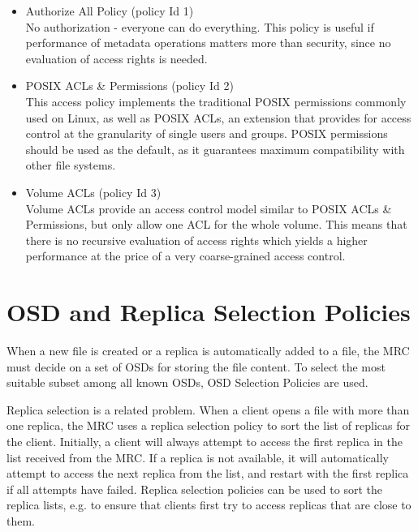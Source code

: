 \documentclass[a4paper,10pt]{book}
\begin{document}
\begin{itemize}
 \item Authorize All Policy (policy Id 1)\\
No authorization - everyone can do everything. This policy is useful if performance of metadata operations matters more than security, since no evaluation of access rights is needed.

 \item POSIX ACLs \& Permissions (policy Id 2)\\
This access policy implements the traditional POSIX permissions commonly used on Linux, as well as POSIX ACLs, an extension that provides for access control at the granularity of single users and groups. POSIX permissions should be used as the default, as it guarantees maximum compatibility with other file systems.

 \item Volume ACLs (policy Id 3)\\
Volume ACLs provide an access control model similar to POSIX ACLs \& Permissions, but only allow one ACL for the whole volume. This means that there is no recursive evaluation of access rights which yields a higher performance at the price of a very coarse-grained access control.
\end{itemize}


\section{OSD and Replica Selection Policies} \label{sec:osd_policies}
When a new file is created or a replica is automatically added to a file, the MRC must decide on a set of OSDs for storing the file content. To select the most suitable subset among all known OSDs, OSD Selection Policies are used.

Replica selection is a related problem. When a client opens a file with more than one replica, the MRC uses a replica selection policy to sort the list of replicas for the client. Initially, a client will always attempt to access the first replica in the list received from the MRC. If a replica is not available, it will automatically attempt to access the next replica from the list, and restart with the first replica if all attempts have failed. Replica selection policies can be used to sort the replica lists, e.g. to ensure that clients first try to access replicas that are close to them.
\end{document}
